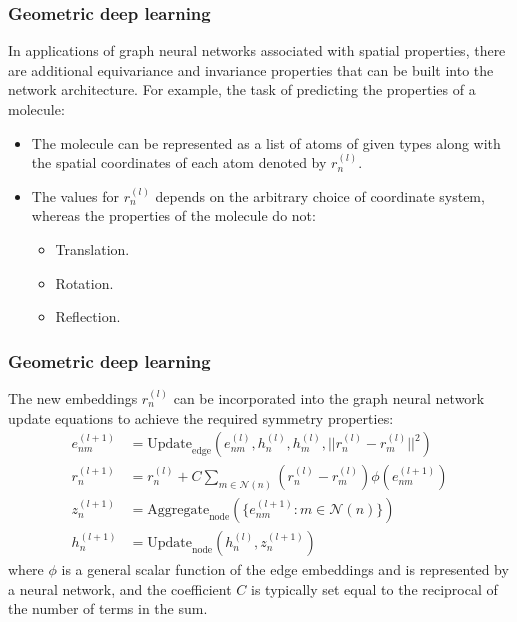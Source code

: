 \documentclass{beamer}
\begin{document}
\begin{frame}
    \frametitle{Geometric deep learning}
    In applications of graph neural networks associated with spatial properties, there are additional equivariance and invariance properties that can be built into the network architecture. For example, the task of predicting the properties of a molecule:
    \begin{itemize}
        \item The molecule can be represented as a list of atoms of given types along with the spatial coordinates of each atom denoted by $r^{(l)}_{n}$.
        \item The values for $r^{(l)}_{n}$ depends on the arbitrary choice of coordinate system, whereas the properties of the molecule do not:
        \begin{itemize}
            \item Translation.
            \item Rotation.
            \item Reflection.
        \end{itemize}
    \end{itemize}
\end{frame}

\begin{frame}
    \frametitle{Geometric deep learning}
    The new embeddings $r^{(l)}_{n}$ can be incorporated into the graph neural network update equations to achieve the required symmetry properties:
    \begin{align*}
        e^{(l+1)}_{nm}&=\mathrm{Update}_{\textrm{edge}}(e^{(l)}_{nm},h^{(l)}_{n},h^{(l)}_{m},||r^{(l)}_{n}-r^{(l)}_{m}||^{2}) \\
        r^{(l+1)}_{n}&=r^{(l)}_{n}+C\sum_{m\in\mathcal{N}(n)}(r^{(l)}_{n}-r^{(l)}_{m})\phi(e^{(l+1)}_{nm}) \\
        z^{(l+1)}_{n}&=\mathrm{Aggregate}_{\textrm{node}}(\{e^{(l+1)}_{nm}:m\in\mathcal{N}(n)\}) \\
        h^{(l+1)}_{n}&=\mathrm{Update}_{\textrm{node}}(h^{(l)}_{n},z^{(l+1)}_{n})
    \end{align*}
    where $\phi$ is a general scalar function of the edge embeddings and is represented by a neural network, and the coefficient $C$ is typically set equal to the reciprocal of the number of terms in the sum.
\end{frame}
\end{document}
